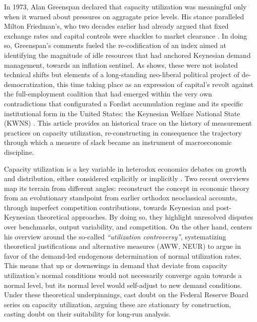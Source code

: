\documentclass[11pt]{article}
\begin{document}
In 1973, Alan Greenspan declared that capacity utilization was meaningful only when it warned about pressures on aggragate price levels. His stance paralleled Milton Friedman’s, who two decades earlier had already argued that fixed exchange rates and capital controls were shackles to market clearance \citep{friedman1953}. In doing so, Greenspan’s comments fueled the re-codification of an index aimed at identifying the magnitude of idle resources that had anchored Keynesian demand management, towards an inflation sentinel. As \citet{kiely2016} shows, these were not isolated technical shifts but elements of a long-standing neo-liberal political project of de-democratization, this time taking place as an expression of capital’s revolt against the full-employment coalition that had emerged within the very own contradictions that configurated a Fordist accumulation regime and its specific institutional form in the United States: the Keynesian Welfare National State (KWNS) \citep{vidal2015}. This article provides an historical trace on the history of measurement practices on capacity utilization, re-constructing in consequence the trajectory through which a measure of slack became an instrument of macroeconomic discipline. 

Capacity utilization is a key variable in heterodox economics debates on growth and distribution, either considered explicitly or implicitly \citep{tavanizamparelli2018,bleckersetterfield2019}. Two recent overviews map its terrain from different angles: \citet{trezzinipignalosa2024} reconstruct the concept in economic theory from an evolutionary standpoint from earlier orthodox neoclassical accounts, through imperfect competition contributions, towards Keynesian and post-Keynesian theoretical approaches. By doing so, they highlight unresolved disputes over benchmarks, output variability, and competition. On the other hand, \citet{nikiforos2016} centers his overview around the so-called \textit{``utilization controversy''}, systematizing theoretical justifications and alternative measures (AWW, NEUR) to argue in favor of the demand-led endogenous determination of normal utilization rates. This means that up or downswings in demand that deviate from capacity utilization's normal conditions would not necessarily converge again towards a normal level, but its normal level would self-adjust to new demand conditions. Under these theoretical underpinnings, \citet{nikiforos2016} cast doubt on the Federal Reserve Board series on capacity utilization, arguing these are stationary by construction, casting doubt on their suitability for long-run analysis. 
\end{document}
